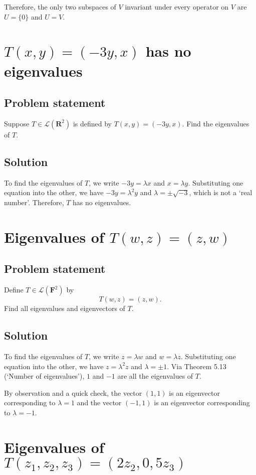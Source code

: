 \documentclass{article}
\begin{document}
Therefore, the only two subspaces of $V$ invariant under every operator on $V$ are $U=\{0\}$ and $U=V$.

\clearpage

\section{$T(x,y)=(-3y,x)$ has no eigenvalues}
\subsection*{Problem statement}
Suppose $T\in\mathcal{L}(\mathbf{R}^2)$ is defined by $T(x,y)=(-3y,x)$. 
Find the eigenvalues of $T$.

\subsection*{Solution}
To find the eigenvalues of $T$, we write $-3y=\lambda x$ and $x=\lambda y$. 
Substituting one equation into the other, we have $-3y=\lambda^2 y$ and $\lambda=\pm\sqrt{-3}$, which is not a `real number'. 
Therefore, $T$ has no eigenvalues.

\clearpage

\section{Eigenvalues of $T(w,z)=(z,w)$}
\subsection*{Problem statement}
Define $T\in\mathcal{L}(\mathbf{F}^2)$ by
\[T(w,z)=(z,w).\]
Find all eigenvalues and eigenvectors of $T$.

\subsection*{Solution}
To find the eigenvalues of $T$, we write $z=\lambda w$ and $w=\lambda z$. 
Substituting one equation into the other, we have $z=\lambda^2 z$ and $\lambda=\pm 1$. 
Via Theorem 5.13 (`Number of eigenvalues'), $1$ and $-1$ are all the eigenvalues of $T$.

By observation and a quick check, the vector $(1,1)$ is an eigenvector corresponding to $\lambda=1$ and the vector $(-1,1)$ is an eigenvector corresponding to $\lambda=-1$.

\clearpage

\section{Eigenvalues of $T(z_1,z_2,z_3)=(2z_2,0,5z_3)$}
\end{document}

